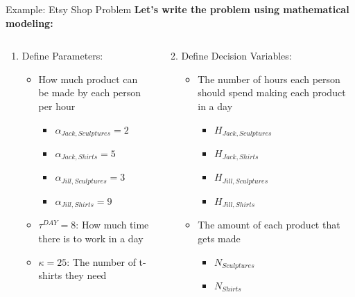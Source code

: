 \documentclass[10pt, aspectratio=169]{beamer}
\begin{document}
\begin{frame}[t]{Example: Etsy Shop Problem}
    \textbf{Let's write the problem using mathematical modeling:}
    \begin{columns}[t]
        \begin{column}[t]{0.5\textwidth}
            \begin{enumerate}
                \item Define Parameters:
                \begin{itemize}
                    \item How much product can be made by each person per hour
                    \begin{itemize}
                        \item $\alpha_{Jack,Sculptures} = 2$
                        \item $\alpha_{Jack,Shirts} = 5$
                        \item $\alpha_{Jill,Sculptures} = 3$
                        \item $\alpha_{Jill,Shirts} = 9$
                    \end{itemize}
                    \item $\tau^{DAY} = 8$: How much time there is to work in a day
                    \item $\kappa = 25$: The number of t-shirts they need
                \end{itemize}
            \end{enumerate}
        \end{column}
        \begin{column}[t]{0.5\textwidth}
            \begin{enumerate}
                \setcounter{enumi}{1}
                \item Define Decision Variables:
                \begin{itemize}
                    \item The number of hours each person should spend making each product in a day
                    \begin{itemize}
                        \item $H_{Jack,Sculptures}$
                        \item $H_{Jack,Shirts}$
                        \item $H_{Jill,Sculptures}$
                        \item $H_{Jill,Shirts}$
                    \end{itemize}
                    \item The amount of each product that gets made
                    \begin{itemize}
                        \item $N_{Sculptures}$
                        \item $N_{Shirts}$
                    \end{itemize}
                \end{itemize}
            \end{enumerate}
        \end{column}
    \end{columns}
\end{frame}
\end{document}
